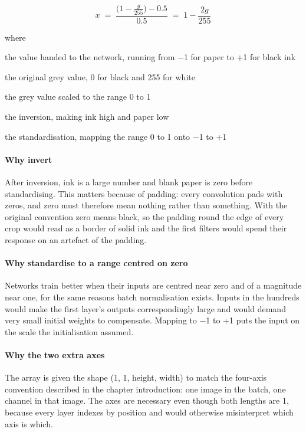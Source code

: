 \begin{equation}
x \;=\; \frac{\big(1 - \frac{g}{255}\big) - 0.5}{0.5} \;=\; 1 - \frac{2g}{255}
\end{equation}

\noindent where
\begin{description}[leftmargin=2.4em,style=nextline,font=\normalfont\ttfamily]\setlength\itemsep{1pt}
  \item[{$x$}] \normalfont the value handed to the network, running from $-$1 for paper to +1 for black ink
  \item[{$g$}] \normalfont the original grey value, 0 for black and 255 for white
  \item[{$\frac{g}{255}$}] \normalfont the grey value scaled to the range 0 to 1
  \item[{$1 - \cdot$}] \normalfont the inversion, making ink high and paper low
  \item[{$\frac{\cdot - 0.5}{0.5}$}] \normalfont the standardisation, mapping the range 0 to 1 onto $-$1 to +1
\end{description}

\paragraph{Why invert}
After inversion, ink is a large number and blank paper is zero before standardising. This matters because of padding: every convolution pads with zeros, and zero must therefore mean nothing rather than something. With the original convention zero means black, so the padding round the edge of every crop would read as a border of solid ink and the first filters would spend their response on an artefact of the padding.


\paragraph{Why standardise to a range centred on zero}
Networks train better when their inputs are centred near zero and of a magnitude near one, for the same reasons batch normalisation exists. Inputs in the hundreds would make the first layer's outputs correspondingly large and would demand very small initial weights to compensate. Mapping to $-$1 to +1 puts the input on the scale the initialisation assumed.


\paragraph{Why the two extra axes}
The array is given the shape (1, 1, height, width) to match the four-axis convention described in the chapter introduction: one image in the batch, one channel in that image. The axes are necessary even though both lengths are 1, because every layer indexes by position and would otherwise misinterpret which axis is which.


